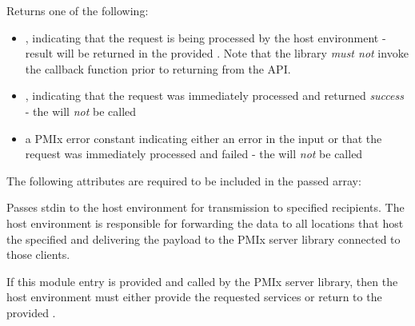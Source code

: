 \begin{arglist}
\end{arglist}

Returns one of the following:

\begin{itemize}
    \item {}, indicating that the request is being processed by the host environment - result will be returned in the provided . Note that the library \emph{must not} invoke the callback function prior to returning from the \ac{API}.
    \item {}, indicating that the request was immediately processed and returned \textit{success} - the  will \textit{not} be called
    \item a PMIx error constant indicating either an error in the input or that the request was immediately processed and failed - the  will \textit{not} be called
\end{itemize}

\reqattrstart
The following attributes are required to be included in the passed  array:


\reqattrend

\descr

Passes stdin to the host environment for transmission to specified recipients. The host environment is responsible for forwarding the data to all locations that host the specified  and delivering the payload to the \ac{PMIx} server library connected to those clients.

\advicermstart
If this module entry is provided and called by the \ac{PMIx} server library, then the host environment must either provide the requested services or return  to the provided .
\advicermend

